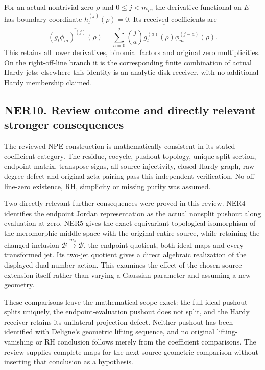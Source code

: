 For an actual nontrivial zero \(\rho\) and \(0\le j<m_\rho\), the
derivative functional on \(E\) has boundary coordinate
\(h_t^{(j)}(\rho)=0\). Its received coefficients are \[
\overline{(g_t\phi_m)^{(j)}(\rho)}
=\overline{\sum_{a=0}^j\binom ja
g_t^{(a)}(\rho)\phi_m^{(j-a)}(\rho)}.
\tag{NER9.3}
\] This retains all lower derivatives, binomial factors and original
zero multiplicities. On the right-off-line branch it is the
corresponding finite combination of actual Hardy jets; elsewhere this
identity is an analytic disk receiver, with no additional Hardy
membership claimed.

\subsection{NER10. Review outcome and directly relevant stronger
consequences}\label{ner10.-review-outcome-and-directly-relevant-stronger-consequences}

The reviewed NPE construction is mathematically consistent in its stated
coefficient category. The residue, cocycle, pushout topology, unique
split section, endpoint matrix, transpose signs, all-source injectivity,
closed Hardy graph, raw degree defect and original-zeta pairing pass
this independent verification. No off-line-zero existence, RH,
simplicity or missing purity was assumed.

Two directly relevant further consequences were proved in this review.
NER4 identifies the endpoint Jordan representation as the actual
nonsplit pushout along evaluation at zero. NER5 gives the exact
equivariant topological isomorphism of the meromorphic middle space with
the original entire source, while retaining the changed inclusion
\(\mathcal B\xrightarrow{m_s}\mathcal B\), the endpoint quotient, both
ideal maps and every transformed jet. Its two-jet quotient gives a
direct algebraic realization of the displayed dual-number action. This
examines the effect of the chosen source extension itself rather than
varying a Gaussian parameter and assuming a new geometry.

These comparisons leave the mathematical scope exact: the full-ideal
pushout splits uniquely, the endpoint-evaluation pushout does not split,
and the Hardy receiver retains its unilateral projection defect. Neither
pushout has been identified with Deligne's geometric lifting sequence,
and no original lifting-vanishing or RH conclusion follows merely from
the coefficient comparisons. The review supplies complete maps for the
next source-geometric comparison without inserting that conclusion as a
hypothesis.

